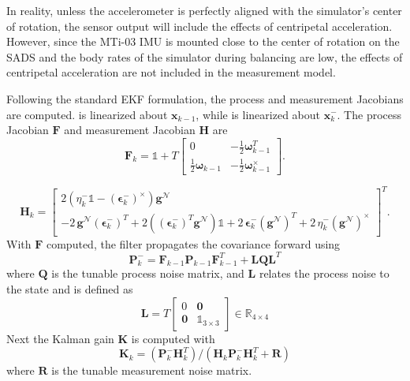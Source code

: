 In reality, unless the accelerometer is perfectly aligned with the simulator's center of rotation, the sensor output will include the effects of centripetal acceleration. However, since the MTi-03 IMU is mounted close to the center of rotation on the SADS and the body rates of the simulator during balancing are low, the effects of centripetal acceleration are not included in the measurement model.

Following the standard EKF formulation, the process and measurement Jacobians are computed.  is linearized about $\bm{x}_{k-1}$, while  is linearized about $\bm{x}_k^-$. The process Jacobian $\bm{F}$ and measurement Jacobian $\bm{H}$ are 
\begin{equation}
    \bm{F}_k = \mathbb{1}+
T\begin{bmatrix}
0 & -\tfrac{1}{2}\bm{\omega}_{k-1}^{T}\\[3pt]
\tfrac{1}{2}\bm{\omega}_{k-1} & -\tfrac{1}{2}\bm{\omega}_{k-1}^{\times}
\end{bmatrix}.
\end{equation}

\begin{equation}
\bm{H}_k =
\begin{bmatrix}
2\!\left(\eta_k^- \mathbb{1} - (\bm{\epsilon}_k^-)^{\times}\right)\bm{g}^{\mathcal N}
\\
-2\,\bm{g}^{\mathcal N}(\bm{\epsilon}_k^-)^{\!T}
+2\!\left((\bm{\epsilon}_k^-)^{\!T}\bm{g}^{\mathcal N}\right)\mathbb{1}
+2\,\bm{\epsilon}_k^- (\bm{g}^{\mathcal N})^{\!T}
+2\,\eta_k^- (\bm{g}^{\mathcal N})^{\times}
\end{bmatrix}^T.
\end{equation}
With $\bm{F}$ computed, the filter propagates the covariance forward using
\begin{equation}
        \bm{P}_k^- = \bm{F}_{k-1}\bm{P}_{k-1}\bm{F}_{k-1}^T + \bm{L}\bm{Q}\bm{L}^T
\end{equation}
where $\bm{Q}$ is the tunable process noise matrix, and $\bm{L}$ relates the process noise to the state and is defined as
\begin{equation}
    \bm{L} = T\begin{bmatrix}
        0      & \bm{0} \\
        \bm{0} & \mathbb{1}_{3\times3}
    \end{bmatrix}\in\mathbb{R}_{4\times4}
\end{equation}
Next the Kalman gain $\bm{K}$ is computed with
\begin{equation}
    \bm{K}_k = (\bm{P}_k^-\bm{H}_k^T)/(\bm{H}_k\bm{P}_k^-\bm{H}_k^T + \bm{R})
\end{equation}
where $\bm{R}$ is the tunable measurement noise matrix.

